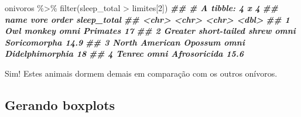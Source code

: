 \documentclass[
  11pt]{report}
\newenvironment{Shaded}{\begin{snugshade}}{\end{snugshade}}
\newcommand{\DecValTok}[1]{\textcolor[rgb]{0.00,0.00,0.81}{#1}}
\newcommand{\DocumentationTok}[1]{\textcolor[rgb]{0.56,0.35,0.01}{\textbf{\textit{#1}}}}
\newcommand{\FunctionTok}[1]{\textcolor[rgb]{0.00,0.00,0.00}{#1}}
\newcommand{\NormalTok}[1]{#1}
\newcommand{\SpecialCharTok}[1]{\textcolor[rgb]{0.00,0.00,0.00}{#1}}
\renewenvironment{Shaded}{
    \begin{mdframed}[%
      roundcorner=2pt,%
      innerleftmargin=5pt,%
      innerrightmargin=5pt,%
      topline=true,%
      leftline=true,%
      rightline=true,%
      bottomline=true,%
      linewidth=0.5pt,%
      linecolor=black!20,%
      backgroundcolor=black!2,%
      skipabove=2ex,%
      skipbelow=2.5ex%
    ]%
  }
  {
    \end{mdframed}
  }
\begin{document}
\begin{itemize}
\begin{Shaded}
\begin{Highlighting}[]
\NormalTok{onivoros }\SpecialCharTok{\%\textgreater{}\%} 
  \FunctionTok{filter}\NormalTok{(sleep\_total }\SpecialCharTok{\textgreater{}}\NormalTok{ limites[}\DecValTok{2}\NormalTok{])}
\DocumentationTok{\#\# \# A tibble: 4 x 4}
\DocumentationTok{\#\#   name                       vore  order           sleep\_total}
\DocumentationTok{\#\#   \textless{}chr\textgreater{}                      \textless{}chr\textgreater{} \textless{}chr\textgreater{}                 \textless{}dbl\textgreater{}}
\DocumentationTok{\#\# 1 Owl monkey                 omni  Primates               17  }
\DocumentationTok{\#\# 2 Greater short{-}tailed shrew omni  Soricomorpha           14.9}
\DocumentationTok{\#\# 3 North American Opossum     omni  Didelphimorphia        18  }
\DocumentationTok{\#\# 4 Tenrec                     omni  Afrosoricida           15.6}
\end{Highlighting}
\end{Shaded}

  Sim! Estes animais dormem demais em comparação com os outros onívoros.
\end{itemize}

\hypertarget{gerando-boxplots}{%
\subsection{Gerando boxplots}\label{gerando-boxplots}}
\end{document}
